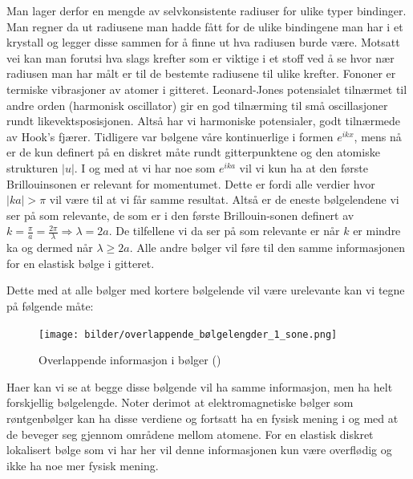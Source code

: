 \documentclass{article}
\begin{document}
Man lager derfor en mengde av selvkonsistente radiuser for ulike typer bindinger. Man regner da ut radiusene man hadde fått for de ulike bindingene man har i et krystall og legger disse sammen for å finne ut hva radiusen burde være. Motsatt vei kan man forutsi hva slags krefter som er viktige i et stoff ved å se hvor nær radiusen man har målt er til de bestemte radiusene til ulike krefter.
\nyside
{}
Fononer er termiske vibrasjoner av atomer i gitteret. Leonard-Jones potensialet tilnærmet til andre orden (harmonisk oscillator) gir en god tilnærming til små oscillasjoner rundt likevektsposisjonen. Altså har vi harmoniske potensialer, godt tilnærmede av Hook's fjærer. Tidligere var bølgene våre kontinuerlige i formen $e^{ikx}$, mens nå er de kun definert på en diskret måte rundt gitterpunktene og den atomiske strukturen $|u|$. I og med at vi har noe som $e^{ika}$ vil vi kun ha at den første Brillouinsonen er relevant for momentumet. Dette er fordi alle verdier hvor $|ka| > \pi$ vil være til at vi får samme resultat. Altså er de eneste bølgelendene vi ser på som relevante, de som er i den første Brillouin-sonen definert av $k = \frac{\pi}{a} = \frac{2\pi}{\lambda} \Rightarrow \lambda = 2a$. De tilfellene vi da ser på som relevante er når $k$ er mindre ka og dermed når $\lambda \geq 2a$. Alle andre bølger vil føre til den samme informasjonen for en elastisk bølge i gitteret.

Dette med at alle bølger med kortere bølgelende vil være urelevante kan vi tegne på følgende måte:
\begin{figure}[H]
    \centering
    \texttt{[image: bilder/overlappende\_bølgelengder\_1\_sone.png]}
    \caption{Overlappende informasjon i bølger (\cite{Aleksander})}
    \label{fig:overlappende_bølgelengder_1_sone}
\end{figure}
Haer kan vi se at begge disse bølgende vil ha samme informasjon, men ha helt forskjellig bølgelengde. Noter derimot at elektromagnetiske bølger som røntgenbølger kan ha disse verdiene og fortsatt ha en fysisk mening i og med at de beveger seg gjennom områdene mellom atomene. For en elastisk diskret lokalisert bølge som vi har her vil denne informasjonen kun være overflødig og ikke ha noe mer fysisk mening.
\end{document}
